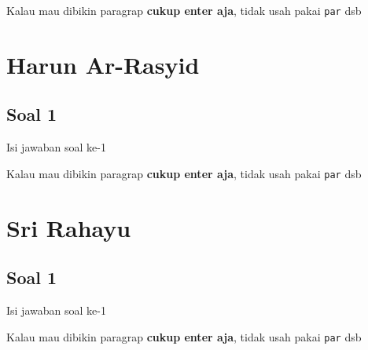 Kalau mau dibikin paragrap \textbf{cukup enter aja}, tidak usah pakai \verb|par| dsb



\section{Harun Ar-Rasyid}
\subsection{Soal 1}
Isi jawaban soal ke-1

Kalau mau dibikin paragrap \textbf{cukup enter aja}, tidak usah pakai \verb|par| dsb



\section{Sri Rahayu}
\subsection{Soal 1}
Isi jawaban soal ke-1

Kalau mau dibikin paragrap \textbf{cukup enter aja}, tidak usah pakai \verb|par| dsb



